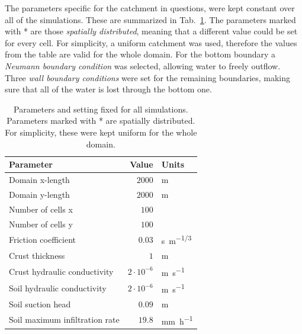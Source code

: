 The parameters specific for the catchment in questions, were kept constant over all of the simulations.
These are summarized in Tab.~\ref{tab:simulations_parameters}.
The parameters marked with * are those \emph{spatially distributed}, meaning that a different value could be set for every cell.
For simplicity, a uniform catchment was used, therefore the values from the table are valid for the whole domain.
For the bottom boundary a \textit{Neumann boundary condition} was selected, allowing water to freely outflow.
Three \textit{wall boundary conditions} were set for the remaining boundaries, making sure that all of the water is lost through the bottom one.

\begin{table}[h]
  \centering
  \caption{Parameters and setting fixed for all simulations. Parameters marked with * are spatially distributed. For simplicity, these were kept uniform for the whole domain.}
  \label{tab:simulations_parameters}
  \begin{threeparttable}
    \begin{tabular}{lrl}
      \toprule
      \textbf{Parameter} & \textbf{Value} & \textbf{Units} \\
      \midrule
      Domain x-length                          &    $\num{2000}$           & \si{\meter}   \\
      Domain y-length                          &    $\num{2000}$           & \si{\meter}   \\
      Number of cells x                        &    $100$             &    \\
      Number of cells y                        &    $100$             &    \\
      Friction coefficient\tnote{*}            &    $0.03$            & \si{s.m^{-1/3}}\\
      Crust thickness\tnote{*}                 &    $1$               & \si{\meter}\\
      Crust hydraulic conductivity\tnote{*}    &    $2\cdot 10^{-6}$  & \si{\meter\per\second}\\
      Soil hydraulic conductivity\tnote{*}     &    $2\cdot 10^{-6}$  & \si{\meter\per\second}\\
      Soil suction head\tnote{*}               &    $0.09$      & \si{\meter}\\
      Soil maximum infiltration rate\tnote{*}  &    $19.8$      & \si{\milli\meter\per\hour}\\
      \bottomrule
    \end{tabular}
  \end{threeparttable}
\end{table}

